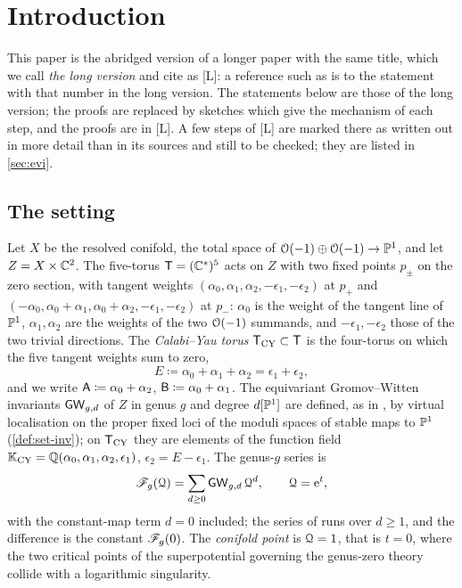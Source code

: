 \section{Introduction}
\label{sec:int}

This paper is the abridged version of a longer paper with the same title, which we call \emph{the long version} and cite as [L]: a reference such as  is to the statement with that number in the long version. The statements below are those of the long version; the proofs are replaced by sketches which give the mechanism of each step, and the proofs are in [L]. A few steps of [L] are marked there as written out in more detail than in its sources and still to be checked; they are listed in \cref{sec:evi}.

\subsection{The setting}
\label{sec:int-setting}

Let $X$ be the resolved conifold, the total space of $\mathcal{O}(-1)\oplus\mathcal{O}(-1)\to\mathbb{P}^1$, and let $Z=X\times\mathbb{C}^2$. The five-torus $\mathsf{T}=(\mathbb{C}^*)^5$ acts on $Z$ with two fixed points $p_\pm$ on the zero section, with tangent weights $(\alpha_0,\alpha_1,\alpha_2,-\epsilon_1,-\epsilon_2)$ at $p_+$ and $(-\alpha_0,\alpha_0+\alpha_1,\alpha_0+\alpha_2,-\epsilon_1,-\epsilon_2)$ at $p_-$: $\alpha_0$ is the weight of the tangent line of $\mathbb{P}^1$, $\alpha_1,\alpha_2$ are the weights of the two $\mathcal{O}(-1)$ summands, and $-\epsilon_1,-\epsilon_2$ those of the two trivial directions. The \emph{Calabi--Yau torus} $\mathsf{T}_{\mathrm{CY}}\subset\mathsf{T}$ is the four-torus on which the five tangent weights sum to zero,
\[
E\coloneqq\alpha_0+\alpha_1+\alpha_2=\epsilon_1+\epsilon_2 ,
\]
and we write $\mathsf{A}\coloneqq\alpha_0+\alpha_2$, $\mathsf{B}\coloneqq\alpha_0+\alpha_1$. The equivariant Gromov--Witten invariants $\mathsf{GW}_{g,d}$ of $Z$ in genus $g$ and degree $d[\mathbb{P}^1]$ are defined, as in \cite{BS}, by virtual localisation on the proper fixed loci of the moduli spaces of stable maps to $\mathbb{P}^1$ (\cref{def:set-inv}); on $\mathsf{T}_{\mathrm{CY}}$ they are elements of the function field $\mathbb{K}_{\mathrm{CY}}=\mathbb{Q}(\alpha_0,\alpha_1,\alpha_2,\epsilon_1)$, $\epsilon_2=E-\epsilon_1$. The genus-$g$ series is
\[
\mathscr{F}_g(\mathcal{Q})=\sum_{d\geq0}\mathsf{GW}_{g,d}\,\mathcal{Q}^d ,\qquad \mathcal{Q}=\mathrm{e}^{t},
\]
with the constant-map term $d=0$ included; the series of \cite{BS} runs over $d\geq1$, and the difference is the constant $\mathscr{F}_g(0)$. The \emph{conifold point} is $\mathcal{Q}=1$, that is $t=0$, where the two critical points of the superpotential governing the genus-zero theory collide with a logarithmic singularity.

